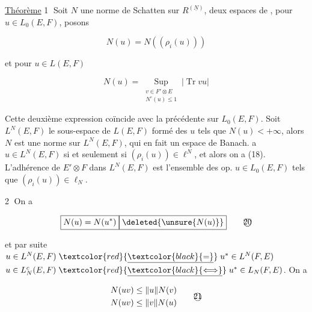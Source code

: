 
\uline{Théorème} \textcircled{1} Soit $N$ une norme de Schatten sur $R^{(\underline N)}$,  deux espaces de ,  pour $u\in L_0(E,F)$, posons

\[
N(u)=N((\rho_i(u)))\tag*{(18)}
\]

et pour $u\in L(E,F)$

\[
N(u)=\underset{\substack{v\in F'\otimes E\\N^\circ(u)\leq 1}}{\operatorname{Sup}}|\operatorname{Tr}vu|\tag*{(19)}
\]

Cette deuxième expression coïncide avec la précédente sur $L_0(E,F)$. Soit $L^N(E,F)$ le sous-espace de $L(E,F)$ formé des $u$ tels que $N(u)<+\infty$, alors $N$ est une norme sur $L^N(E,F)$, qui en fait un espace de Banach.   a $u\in L^N(E,F)$ si et seulement si $(\rho_i(u))\in\ell^N$, et alors on a (18).  L'adhérence  de $E'\otimes F$ dans $L^N(E,F)$ est l'ensemble des op.  $u\in L_0(E,F)$ tels que $(\rho_i(u))\in\ell_N$.

\textcircled{2} On a

\[
\boxed{N(u)=N(u^*)}\boxed{\deleted{\unsure{N(u)}}}\tag*{\textcircled{20}}
\]

et par suite $u\in L^N(E,F)\mathrel{\textcolor{red}{\underline{\textcolor{black}{=}}}}u^*\in L^N(F,E)$
 $u\in L_N^c(E,F)\mathrel{\textcolor{red}{\underline{\textcolor{black}{\Longleftrightarrow}}}}u^*\in L_N(F,E)$. On a

\[
\begin{aligned}
N(uv)&\leq\lVert u\rVert N(v)\\
N(uv)&\leq\lVert v\rVert N(u)
\end{aligned}\tag*{\textcircled{21}}
\]

